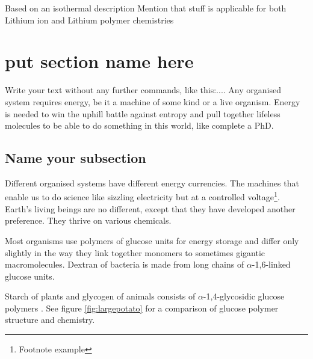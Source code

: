 Based on an isothermal description
Mention that stuff is applicable for both Lithium ion and Lithium polymer chemistries

\section{put section name here} %
Write your text without any further commands, like this:.... Any organised system requires energy, be it a machine of some kind or a live organism. Energy is needed to win the uphill battle against entropy and pull together lifeless molecules to be able to do something in this world, like complete a PhD.



\subsection{Name your subsection} %
Different organised systems have different energy currencies. The machines that enable us to do science like sizzling electricity but at a controlled voltage\footnote{Footnote example}. Earth's living beings are no different, except that they have developed another preference. They thrive on various chemicals.

Most organisms use polymers of glucose units for energy storage and differ only slightly in the way they link together monomers to sometimes gigantic macromolecules. Dextran of bacteria is made from long chains of $\alpha$-1,6-linked glucose units.









Starch of plants and glycogen of animals consists of $\alpha$-1,4-glycosidic glucose polymers \cite{lastname07}. See figure \ref{fig:largepotato} for a comparison of glucose polymer structure and chemistry.

